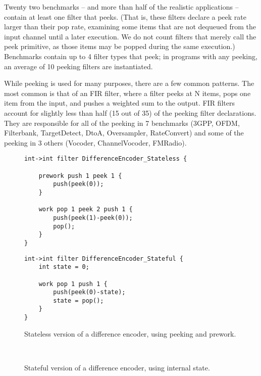 \mybegin

  Twenty two
benchmarks -- and more than half of the realistic applications --
contain at least one filter that peeks.  (That is, these filters
declare a peek rate larger than their pop rate, examining some items
that are not dequeued from the input channel until a later execution.
We do not count filters that merely call the peek primitive, as those
items may be popped during the same execution.)  Benchmarks contain up
to 4 filter types that peek; in programs with any peeking, an average
of 10 peeking filters are instantiated.

While peeking is used for many purposes, there are a few common
patterns.  The most common is that of an FIR filter, where a filter
peeks at N items, pops one item from the input, and pushes a weighted
sum to the output.  FIR filters account for slightly less than half
(15 out of 35) of the peeking filter declarations.  They are
responsible for all of the peeking in 7 benchmarks (3GPP, OFDM,
Filterbank, TargetDetect, DtoA, Oversampler, RateConvert) and some of
the peeking in 3 others (Vocoder, ChannelVocoder, FMRadio).

\begin{figure}[t]
\vspace{1.5\baselineskip}

\begin{minipage}{0.5\textwidth}
\centering
\ninepoint
\begin{verbatim}
int->int filter DifferenceEncoder_Stateless {

    prework push 1 peek 1 {
        push(peek(0));
    }

    work pop 1 peek 2 push 1 {
        push(peek(1)-peek(0));
        pop();
    }
}
\end{verbatim}
\end{minipage}
\begin{minipage}{0.5\textwidth}
\centering
\ninepoint
\begin{verbatim}
int->int filter DifferenceEncoder_Stateful {
    int state = 0;

    work pop 1 push 1 {
        push(peek(0)-state);
        state = pop();
    }
}
\end{verbatim}
\end{minipage}

\begin{minipage}{0.45\textwidth}
\centering
\caption{Stateless version of a difference encoder, using peeking
and prework.\protect\label{fig:diff-stateless}}
\end{minipage}
\begin{minipage}{0.05\textwidth}
~
\end{minipage}
\begin{minipage}{0.45\textwidth}
\centering
\caption{Stateful version of a difference encoder, using 
internal state.\protect\label{fig:diff-stateful}}
\end{minipage}
\end{figure}

